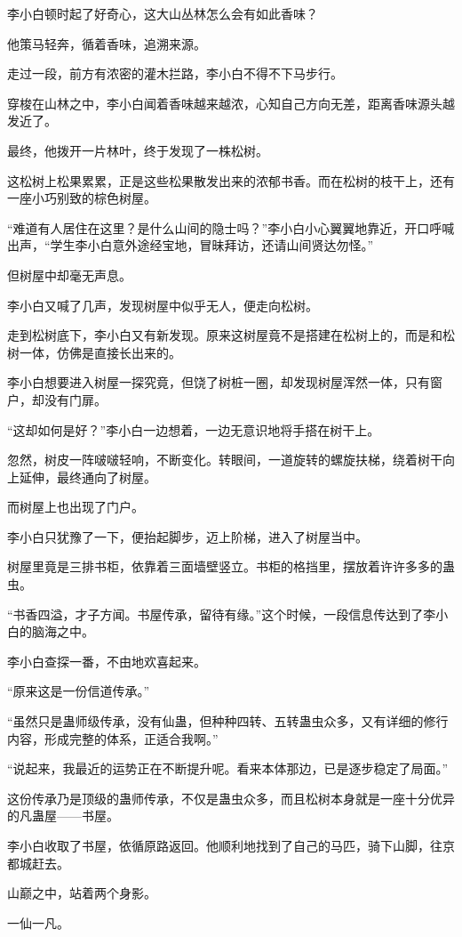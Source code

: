 \begin{this_body}
李小白顿时起了好奇心，这大山丛林怎么会有如此香味？

他策马轻奔，循着香味，追溯来源。

走过一段，前方有浓密的灌木拦路，李小白不得不下马步行。

穿梭在山林之中，李小白闻着香味越来越浓，心知自己方向无差，距离香味源头越发近了。

最终，他拨开一片林叶，终于发现了一株松树。

这松树上松果累累，正是这些松果散发出来的浓郁书香。而在松树的枝干上，还有一座小巧别致的棕色树屋。

“难道有人居住在这里？是什么山间的隐士吗？”李小白小心翼翼地靠近，开口呼喊出声，“学生李小白意外途经宝地，冒昧拜访，还请山间贤达勿怪。”

但树屋中却毫无声息。

李小白又喊了几声，发现树屋中似乎无人，便走向松树。

走到松树底下，李小白又有新发现。原来这树屋竟不是搭建在松树上的，而是和松树一体，仿佛是直接长出来的。

李小白想要进入树屋一探究竟，但饶了树桩一圈，却发现树屋浑然一体，只有窗户，却没有门扉。

“这却如何是好？”李小白一边想着，一边无意识地将手搭在树干上。

忽然，树皮一阵啵啵轻响，不断变化。转眼间，一道旋转的螺旋扶梯，绕着树干向上延伸，最终通向了树屋。

而树屋上也出现了门户。

李小白只犹豫了一下，便抬起脚步，迈上阶梯，进入了树屋当中。

树屋里竟是三排书柜，依靠着三面墙壁竖立。书柜的格挡里，摆放着许许多多的蛊虫。

“书香四溢，才子方闻。书屋传承，留待有缘。”这个时候，一段信息传达到了李小白的脑海之中。

李小白查探一番，不由地欢喜起来。

“原来这是一份信道传承。”

“虽然只是蛊师级传承，没有仙蛊，但种种四转、五转蛊虫众多，又有详细的修行内容，形成完整的体系，正适合我啊。”

“说起来，我最近的运势正在不断提升呢。看来本体那边，已是逐步稳定了局面。”

这份传承乃是顶级的蛊师传承，不仅是蛊虫众多，而且松树本身就是一座十分优异的凡蛊屋——书屋。

李小白收取了书屋，依循原路返回。他顺利地找到了自己的马匹，骑下山脚，往京都城赶去。

山巅之中，站着两个身影。

一仙一凡。


\end{this_body}
